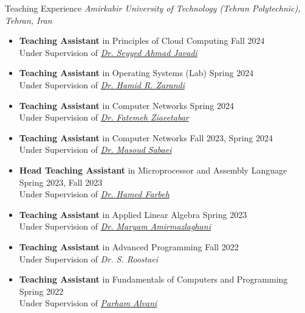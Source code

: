 \documentclass{resume}
\begin{document}
\begin{rSection}{Teaching Experience}
    {\em Amirkabir University of Technology (Tehran Polytechnic), Tehran, Iran}
    \vspace{-0.5em}
    \begin{itemize}[label=$\circ$, leftmargin=1em, topsep=0pt]
        \item {{\bf Teaching Assistant} in Principles of Cloud Computing} \hfill {Fall 2024}\\
        {Under Supervision of \href{https://scholar.google.com/citations?user=Va7RTUsAAAAJ&hl=en}{\em Dr. Seyyed Ahmad Javadi}}

        \item {{\bf Teaching Assistant} in Operating Systems (Lab)} \hfill {Spring 2024}\\
        {Under Supervision of \href{https://scholar.google.com/citations?user=ZA9rRWAAAAAJ&hl=en}{\em Dr. Hamid R. Zarandi}}

        \item {{\bf Teaching Assistant} in Computer Networks} \hfill {Spring 2024}\\
        {Under Supervision of \href{https://dblp.org/pid/203/4521.html}{\em Dr. Fatemeh Ziaeetabar}}

        \item {{\bf Teaching Assistant} in Computer Networks} \hfill {Fall 2023, Spring 2024}\\
        {Under Supervision of \href{https://scholar.google.com/citations?user=aIiC_6UAAAAJ&hl=en}{\em Dr. Masoud Sabaei}}

        \item {{\bf Head Teaching Assistant} in Microprocessor and Assembly Language} \hfill {Spring 2023, Fall 2023}\\
        {Under Supervision of \href{https://scholar.google.com/citations?user=PAZOYiAAAAAJ&hl=en}{\em Dr. Hamed Farbeh}}

        \item {{\bf Teaching Assistant} in Applied Linear Algebra} \hfill {Spring 2023}\\
        {Under Supervision of \href{https://scholar.google.com/citations?user=gxbTUfEAAAAJ&hl=en}{\em Dr. Maryam Amirmazlaghani}}

        \item {{\bf Teaching Assistant} in Advanced Programming} \hfill {Fall 2022}\\
        {Under Supervision of {\em Dr. S. Roostaei}}

        \item {{\bf Teaching Assistant} in Fundamentals of Computers and Programming} \hfill {Spring 2022}\\
        {Under Supervision of \href{https://github.com/1995parham}{\em Parham Alvani}}

    \end{itemize}
\end{rSection}
\end{document}
